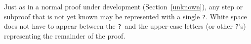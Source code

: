 Just as in a normal proof under development (Section~\ref{unknown}), any step
or subproof that is not yet known may be represented with a single \texttt{?}.
White space does not have to appear between the \texttt{?}\ and the upper-case
letters (or other \texttt{?}'s) representing the remainder of the proof.

%
%
%
%
%
%
%
%
%
%
%
%
%
%
%
%
%
%
%
%
%
%
%
%
